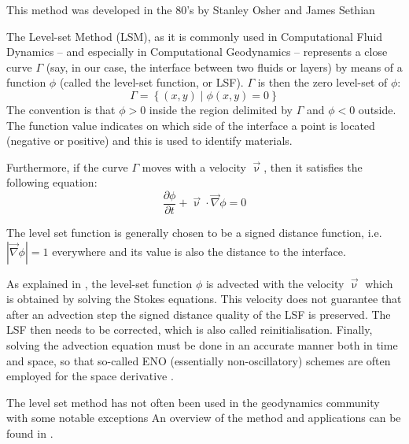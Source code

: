 This method was developed in the 80's by Stanley Osher and James Sethian \cite{}

The Level-set Method (LSM), as it is commonly used in Computational Fluid Dynamics -- and especially 
in Computational Geodynamics -- represents a close curve $\Gamma$ (say, in our case, the 
interface between two fluids or layers) by means of a function $\phi$ (called the level-set function, or LSF).
$\Gamma$ is then the zero level-set of $\phi$:
\begin{equation}
\Gamma = \left\{ (x,y) \; |\; \phi(x,y)=0 \right\}
\end{equation}
The convention is that $\phi>0$ inside the region delimited by $\Gamma$ and $\phi<0$ outside.
The function value indicates on which side of the
interface a point is located (negative or positive) and this is
used to identify materials. 

Furthermore, if the curve $\Gamma$ moves with a velocity $\vec \upnu$, 
then it satisfies the following equation:
\begin{equation}
\frac{\partial \phi}{\partial t} + \vec\upnu \cdot \vec\nabla \phi = 0 
\end{equation}

The level set function is generally chosen to
be a signed distance function, i.e. $|\vec\nabla \phi| = 1$ everywhere 
and its value is also the distance to the interface.

As explained in \cite{hitg14}, the level-set function $\phi$ is advected 
with the velocity $\vec\upnu$ which is obtained by solving the Stokes equations.
This velocity does not guarantee that after an advection step the signed 
distance quality of the LSF is preserved. 
The LSF then needs to be corrected, which is also called reinitialisation. 
Finally, solving the advection equation must be done in an accurate manner both in time and space,
so that so-called ENO (essentially non-oscillatory) schemes are often employed for the 
space derivative \cite{ossh91,saev10}.


The level set method has not often been used in the geodynamics 
community with some notable exceptions 
\cite{bomh06,bomh07,habm07,grbh07,zlfd08,hagr10,sunh10,suhe10,hitg14}
An overview of the method and applications can
be found in \cite{osfe01}.

